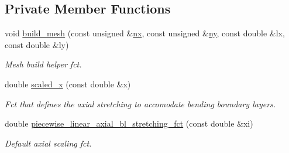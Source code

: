 \subsection*{Private Member Functions}
\begin{DoxyCompactItemize}
\item 
void \hyperlink{classoomph_1_1CircularCylindricalShellMesh_a032ddb9b1afa4ef446ca74c8a6965000}{build\+\_\+mesh} (const unsigned \&\hyperlink{classoomph_1_1RectangularQuadMesh_abfef93d6322886cdce14a437186e4821}{nx}, const unsigned \&\hyperlink{classoomph_1_1RectangularQuadMesh_a86d76a55eb7c4e8bca9b74d23c8b0412}{ny}, const double \&lx, const double \&ly)
\begin{DoxyCompactList}\small\item\em Mesh build helper fct. \end{DoxyCompactList}\item 
double \hyperlink{classoomph_1_1CircularCylindricalShellMesh_a4fb67c76ca3ad60efadfe2d3aabcfa0b}{scaled\+\_\+x} (const double \&x)
\begin{DoxyCompactList}\small\item\em Fct that defines the axial stretching to accomodate bending boundary layers. \end{DoxyCompactList}\item 
double \hyperlink{classoomph_1_1CircularCylindricalShellMesh_a5730df8baedd890ca909f31e5452f3db}{piecewise\+\_\+linear\+\_\+axial\+\_\+bl\+\_\+stretching\+\_\+fct} (const double \&xi)
\begin{DoxyCompactList}\small\item\em Default axial scaling fct. \end{DoxyCompactList}\end{DoxyCompactItemize}
